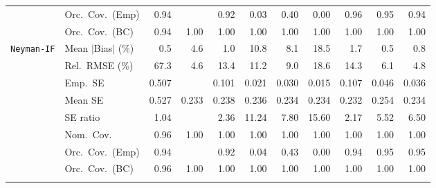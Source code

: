 \begin{landscape}
\begin{longtable}{llrrrrrrrrr}
 & Orc.\ Cov.\ (Emp) & \cellcolor{ranktwo}0.94 &  & \cellcolor{rankthree}0.92 & 0.03 & 0.40 & 0.00 & \cellcolor{ranktwo}0.96 & \cellcolor{rankone}0.95 & \cellcolor{ranktwo}0.94 \\
 & Orc.\ Cov.\ (BC) & \cellcolor{rankone}0.94 & \cellcolor{ranktwo}1.00 & \cellcolor{ranktwo}1.00 & \cellcolor{ranktwo}1.00 & \cellcolor{ranktwo}1.00 & \cellcolor{ranktwo}1.00 & \cellcolor{ranktwo}1.00 & \cellcolor{ranktwo}1.00 & \cellcolor{ranktwo}1.00 \\
\addlinespace[2pt]
\quad \texttt{Neyman-IF} & Mean $|$Bias$|$ (\%) & \cellcolor{rankone}0.5 & 4.6 & \cellcolor{rankthree}1.0 & 10.8 & 8.1 & 18.5 & 1.7 & \cellcolor{rankone}0.5 & \cellcolor{ranktwo}0.8 \\
 & Rel.\ RMSE (\%) & 67.3 & \cellcolor{rankone}4.6 & 13.4 & 11.2 & 9.0 & 18.6 & 14.3 & \cellcolor{rankthree}6.1 & \cellcolor{ranktwo}4.8 \\
 & Emp.\ SE & 0.507 &  & 0.101 & 0.021 & 0.030 & 0.015 & 0.107 & 0.046 & 0.036 \\
 & Mean SE & 0.527 & 0.233 & 0.238 & 0.236 & 0.234 & 0.234 & 0.232 & 0.254 & 0.234 \\
 & SE ratio & \cellcolor{rankone}1.04 &  & \cellcolor{rankthree}2.36 & 11.24 & 7.80 & 15.60 & \cellcolor{ranktwo}2.17 & 5.52 & 6.50 \\
 & Nom.\ Cov. & \cellcolor{rankone}0.96 & \cellcolor{ranktwo}1.00 & \cellcolor{ranktwo}1.00 & \cellcolor{ranktwo}1.00 & \cellcolor{ranktwo}1.00 & \cellcolor{ranktwo}1.00 & \cellcolor{ranktwo}1.00 & \cellcolor{ranktwo}1.00 & \cellcolor{ranktwo}1.00 \\
 & Orc.\ Cov.\ (Emp) & \cellcolor{ranktwo}0.94 &  & \cellcolor{rankthree}0.92 & 0.04 & 0.43 & 0.00 & \cellcolor{ranktwo}0.94 & \cellcolor{rankone}0.95 & \cellcolor{rankone}0.95 \\
 & Orc.\ Cov.\ (BC) & \cellcolor{rankone}0.96 & \cellcolor{ranktwo}1.00 & \cellcolor{ranktwo}1.00 & \cellcolor{ranktwo}1.00 & \cellcolor{ranktwo}1.00 & \cellcolor{ranktwo}1.00 & \cellcolor{ranktwo}1.00 & \cellcolor{ranktwo}1.00 & \cellcolor{ranktwo}1.00 \\
\addlinespace[2pt]
\end{longtable}
\end{landscape}

